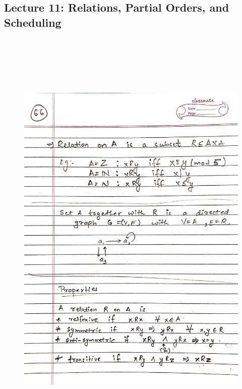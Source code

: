 \newpage
{\color{black} \subsection*{Lecture 11: Relations, Partial Orders, and Scheduling}}
\begin{figure}[H]
    \centering
    \includegraphics[width=16cm, height=21cm]{"./MIT-6.042J/MIT-6042J-066"}
\end{figure}

